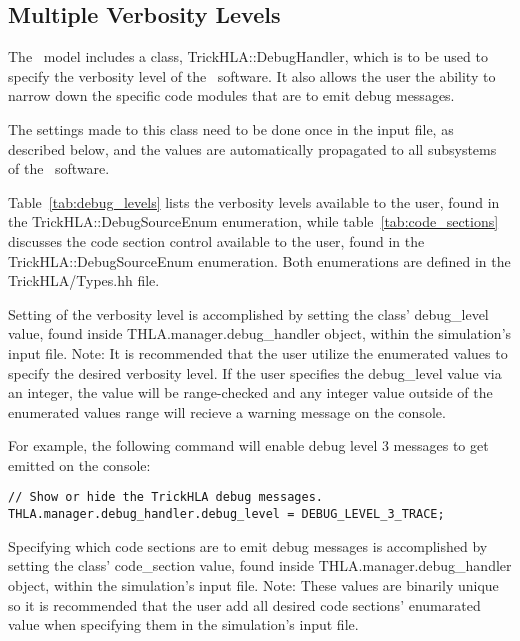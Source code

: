 \subsection{Multiple Verbosity Levels}

The \TrickHLA\ model includes a class, {\ttfamily TrickHLA::DebugHandler},
which is to be used to specify the verbosity level of the \TrickHLA\ software.
It also allows the user the ability to narrow down the specific code modules
that are to emit debug messages.

The settings made to this class need to be done once in the input file, as
described below, and the values are automatically propagated to all subsystems
of the \TrickHLA\ software.

Table~\ref{tab:debug_levels} lists the verbosity levels available to the user,
found in the {\ttfamily TrickHLA::DebugSourceEnum} enumeration, while
table~\ref{tab:code_sections} discusses the code
section control available to the user, found in the {\ttfamily TrickHLA::DebugSourceEnum}
enumeration. Both enumerations are defined in the {\ttfamily TrickHLA/Types.hh}
file.

Setting of the verbosity level is accomplished by setting the class' 
{\ttfamily debug\_level} value, found inside
{\ttfamily THLA.manager.debug\_handler} object, within the simulation's input
file. Note: It is recommended that the user utilize the enumerated values to
specify the desired verbosity level. If the user specifies the
{\ttfamily debug\_level} value via an integer, the value will be range-checked
and any integer value outside of the enumerated values range will recieve a
warning message on the console.

For example, the following command will enable debug level 3 messages to get
emitted on the console:

\begin{verbatim}
// Show or hide the TrickHLA debug messages.
THLA.manager.debug_handler.debug_level = DEBUG_LEVEL_3_TRACE;
\end{verbatim}


Specifying which code sections are to emit debug messages is accomplished by
setting the class' {\ttfamily code\_section} value, found inside
{\ttfamily THLA.manager.debug\_handler} object, within the simulation's input
file. Note: These values are binarily unique so it is recommended that the user
add all desired code sections' enumarated value when specifying them in the
simulation's input file.

